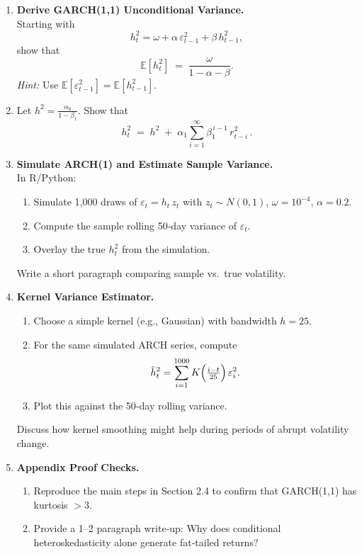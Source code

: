\documentclass[11pt]{amsart}
\begin{document}
\begin{enumerate}[label=\arabic*.,noitemsep,left=0pt]
  \item \textbf{Derive GARCH(1,1) Unconditional Variance.}\\
    Starting with
    \[
      h_t^2 = \omega + \alpha\,\varepsilon_{t-1}^2 + \beta\,h_{t-1}^2,
    \]
    show that
    \[
      \mathbb{E}[h_t^2] \;=\; \frac{\omega}{1 - \alpha - \beta}.
    \]
    \textit{Hint:} Use $\mathbb{E}[\varepsilon_{t-1}^2] = \mathbb{E}[h_{t-1}^2]$.

  \item Let \(h^2 = \frac{\alpha_0}{1 - \beta_1}\). Show that
    \[
      h_t^2 \;=\; h^2 \;+\; \alpha_1 \sum_{i=1}^\infty \beta_1^{\,i-1}\,r_{t-i}^2 \, .
    \]
    

  \item \textbf{Simulate ARCH(1) and Estimate Sample Variance.}\\
    In R/Python:
    \begin{enumerate}[noitemsep,left=1em]
      \item Simulate 1{,}000 draws of $\varepsilon_t = h_t\,z_t$ with $z_t \sim N(0,1)$, $\omega=10^{-4}$, $\alpha=0.2$.
      \item Compute the sample rolling 50‐day variance of $\varepsilon_t$.
      \item Overlay the true $h_t^2$ from the simulation.
    \end{enumerate}
    Write a short paragraph comparing sample vs.\ true volatility.

  \item \textbf{Kernel Variance Estimator.}\\
    \begin{enumerate}[noitemsep,left=1em]
      \item Choose a simple kernel (e.g., Gaussian) with bandwidth $h=25$.
      \item For the same simulated ARCH series, compute
        \[
          \hat h_t^2 = \sum_{i=1}^{1000} K\Bigl(\tfrac{i - t}{25}\Bigr)\,\varepsilon_i^2.
        \]
      \item Plot this against the 50‐day rolling variance.
    \end{enumerate}
    Discuss how kernel smoothing might help during periods of abrupt volatility change.

  \item \textbf{Appendix Proof Checks.}\\
    \begin{enumerate}[noitemsep,left=1em]
      \item Reproduce the main steps in Section 2.4 to confirm that GARCH(1,1) has kurtosis $>3$.
      \item Provide a 1–2 paragraph write‐up: Why does conditional heteroskedasticity alone generate fat‐tailed returns?
    \end{enumerate}


\end{enumerate}
\end{document}
